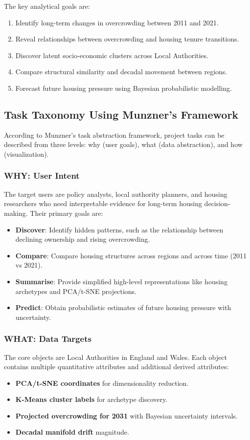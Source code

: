 \documentclass[conference]{IEEEtran}
\begin{document}
The key analytical goals are:
\begin{enumerate}
    \item Identify long-term changes in overcrowding between 2011 and 2021.
    \item Reveal relationships between overcrowding and housing tenure transitions.
    \item Discover latent socio-economic clusters across Local Authorities.
    \item Compare structural similarity and decadal movement between regions.
    \item Forecast future housing pressure using Bayesian probabilistic modelling.
\end{enumerate}

\subsection{Task Taxonomy Using Munzner’s Framework}
According to Munzner's task abstraction framework, project tasks can be described from three levels: why (user goals), what (data abstraction), and how (visualization).\cite{noauthor_visualization_nodate}

\subsubsection{WHY: User Intent}
The target users are policy analysts, local authority planners, and housing researchers who need interpretable evidence for long-term housing decision-making. Their primary goals are:
\begin{itemize}
    \item \textbf{Discover}: Identify hidden patterns, such as the relationship between declining ownership and rising overcrowding.
    \item \textbf{Compare}: Compare housing structures across regions and across time (2011 vs 2021).
    \item \textbf{Summarise}: Provide simplified high-level representations like housing archetypes and PCA/t-SNE projections.
    \item \textbf{Predict}: Obtain probabilistic estimates of future housing pressure with uncertainty.
\end{itemize}

\subsubsection{WHAT: Data Targets}
The core objects are Local Authorities in England and Wales. Each object contains multiple quantitative attributes and additional derived attributes:
\begin{itemize}
    \item \textbf{PCA/t-SNE coordinates} for dimensionality reduction.
    \item \textbf{K-Means cluster labels} for archetype discovery.
    \item \textbf{Projected overcrowding for 2031} with Bayesian uncertainty intervals.
    \item \textbf{Decadal manifold drift} magnitude.
\end{itemize}
\end{document}
